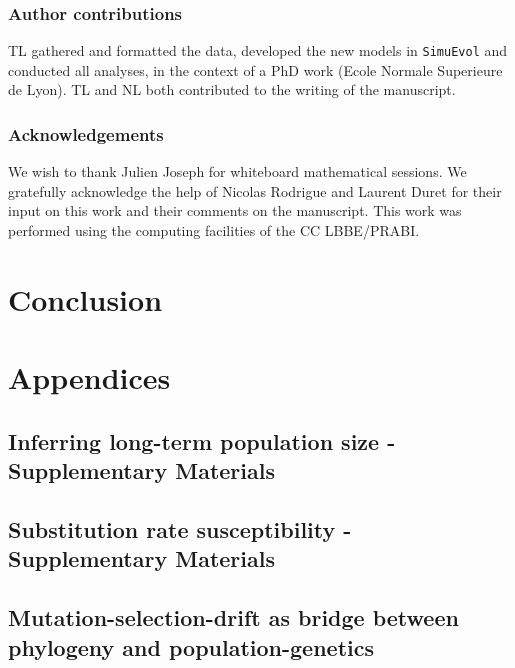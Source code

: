 \documentclass[a4paper,oneside,nobind]{thesis}
\begin{document}
\section{Author contributions}
TL gathered and formatted the data, developed the new models in \texttt{SimuEvol} and conducted all analyses, in the context of a PhD work (Ecole Normale Superieure de Lyon).
TL and NL both contributed to the writing of the manuscript.

\section{Acknowledgements}
We wish to thank Julien Joseph for whiteboard mathematical sessions.
We gratefully acknowledge the help of Nicolas Rodrigue and Laurent Duret for their input on this work and their comments on the manuscript.
This work was performed using the computing facilities of the CC LBBE/PRABI.

\part{Conclusion}
\label{part:conclusion}


\part{Appendices}

\thispagestyle{empty}
\chapter{Inferring long-term population size - Supplementary Materials}
{\hypersetup{linkcolor=GREYDARK}\minitoc}
\label{chap:MutSelDrift-SuppMat}


\thispagestyle{empty}
\chapter{Substitution rate susceptibility - Supplementary Materials}
{\hypersetup{linkcolor=GREYDARK}\minitoc}
\label{chap:GenoPhenoFit-SuppMat}


\chapter*{Mutation-selection-drift as bridge between phylogeny and population-genetics}
\label{sec-appendix:PRF}

\newpage

\thispagestyle{empty}
\label{sec-appendix:MutSelM3starMBE}


\thispagestyle{empty}


\end{document}
